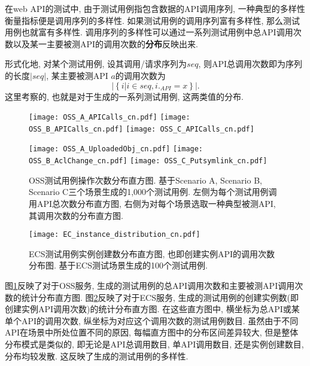             在web API的测试中, 由于测试用例指包含数据的API调用序列, 一种典型的多样性衡量指标便是调用序列的多样性. 如果测试用例的调用序列富有多样性, 那么测试用例也就富有多样性. 调用序列的多样性可以通过一系列测试用例中总API调用次数以及某一主要被测API的调用次数的\textbf{分布}反映出来.

            形式化地, 对某个测试用例, 设其调用/请求序列为$seq$, 则API总调用次数即为序列的长度$|seq|$, 某主要被测API $a$的调用次数为
            \begin{equation}
                |\left\{i | i \in seq, i._{API} = x \right\}|.
            \end{equation}
            这里考察的, 也就是对于生成的一系列测试用例, 这两类值的分布.
            
            \begin{figure}[!htb]
                \begin{minipage}{0.5\textwidth}
                    \centering
                    \texttt{[image: OSS\_A\_APICalls\_cn.pdf]}
                    \texttt{[image: OSS\_B\_APICalls\_cn.pdf]}
                    \texttt{[image: OSS\_C\_APICalls\_cn.pdf]}
                \end{minipage}
                \begin{minipage}{0.5\textwidth}
                    \centering
                    \texttt{[image: OSS\_A\_UploadedObj\_cn.pdf]}
                    \texttt{[image: OSS\_B\_AclChange\_cn.pdf]}
                    \texttt{[image: OSS\_C\_Putsymlink\_cn.pdf]}
                \end{minipage}
                \caption[OSS测试用例API调用次数分布直方图]{OSS测试用例操作次数分布直方图. 基于Scenario A, Scenario B, Scenario C三个场景生成的1,000个测试用例. 左侧为每个测试用例调用API总次数分布直方图, 右侧为对每个场景选取一种典型被测API, 其调用次数的分布直方图.}
                \label{fig:OSS_stat}
            \end{figure}
            
            \begin{figure}[!htb]
                \centering
                \texttt{[image: EC\_instance\_distribution\_cn.pdf]}
                \caption[ECS测试用例实例创建数分布直方图]{ECS测试用例实例创建数分布直方图, 也即创建实例API的调用次数分布图. 基于ECS测试场景生成的100个测试用例.}
                \label{fig:ECS_stat}
            \end{figure}
            
            图\ref{fig:OSS_stat}反映了对于OSS服务, 生成的测试用例的总API调用次数和主要被测API调用次数的统计分布直方图. 图\ref{fig:ECS_stat}反映了对于ECS服务, 生成的测试用例的创建实例数(即创建实例API调用次数)的统计分布直方图. 在这些直方图中, 横坐标为总API或某单个API的调用次数, 纵坐标为对应这个调用次数的测试用例数目. 虽然由于不同API在场景中所处位置不同的原因, 每幅直方图中的分布区间差异较大, 但是整体分布模式是类似的, 即无论是API总调用数目, 单API调用数目, 还是实例创建数目, 分布均较发散. 这反映了生成的测试用例的多样性.
            
